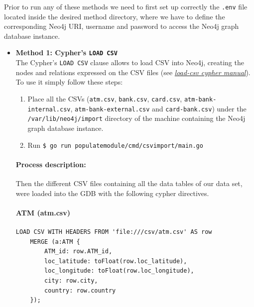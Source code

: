 \documentclass{article}
\begin{document}


Prior to run any of these methods we need to first set up correctly the \texttt{.env} file located inside the desired method directory, where we have to define the corresponding Neo4j URI, username and password to access the Neo4j graph database instance.

\begin{itemize}
\item{\textbf{Method 1: Cypher's \texttt{LOAD CSV}}\\}
The Cypher's \texttt{LOAD CSV} clause allows to load CSV into Neo4j, creating the nodes and relations expressed on the CSV files (see \href{https://neo4j.com/docs/cypher-manual/5/clauses/load-csv/}{\textit{load-csv cypher manual}}). 
To use it simply follow these steps:
\begin{enumerate}
    \item Place all the CSVs (\texttt{atm.csv}, \texttt{bank.csv}, \texttt{card.csv}, \texttt{atm-bank-internal.csv}, \texttt{atm-bank-external.csv} 
    and \texttt{card-bank.csv}) under the \texttt{/var/lib/neo4j/import} directory
    of the machine containing the Neo4j graph database instance.
    \item Run \texttt{\$ go run populatemodule/cmd/csvimport/main.go}
\end{enumerate}

\paragraph{Process description:}

Then the different CSV files containing all the data tables of our data set, were loaded into the GDB with the following cypher directives.


\paragraph{ATM (atm.csv)}

\begin{center}
\lstset{style=cypherStyle}
\begin{lstlisting}[caption={atm.csv}]
    LOAD CSV WITH HEADERS FROM 'file:///csv/atm.csv' AS row
    MERGE (a:ATM {
        ATM_id: row.ATM_id,
        loc_latitude: toFloat(row.loc_latitude),
        loc_longitude: toFloat(row.loc_longitude),
        city: row.city,
        country: row.country
    });
\end{lstlisting}
\end{center}


\end{itemize}
\end{document}
